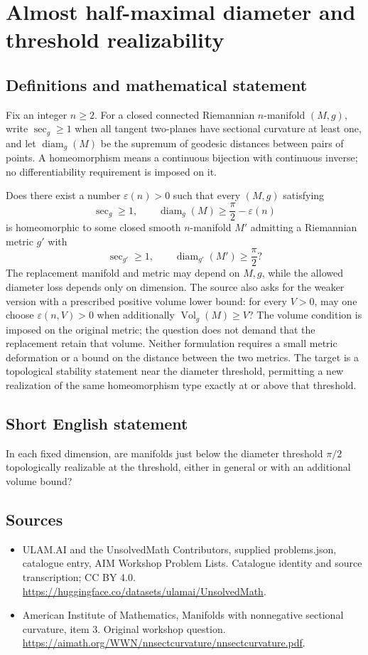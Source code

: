 \documentclass[11pt,a4paper]{article}
\begin{document}
\section*{Almost half-maximal diameter and threshold realizability}\label{statement}

\subsection{Definitions and mathematical statement}
Fix an integer $n\geq2$.
For a closed connected Riemannian $n$-manifold $(M,g)$, write $\sec_g\geq1$ when all tangent two-planes have sectional curvature at least one, and let $\operatorname{diam}_g(M)$ be the supremum of geodesic distances between pairs of points.
A homeomorphism means a continuous bijection with continuous inverse; no differentiability requirement is imposed on it.

Does there exist a number $\varepsilon(n)>0$ such that every $(M,g)$ satisfying
\[
 \sec_g\geq1,\qquad
 \operatorname{diam}_g(M)\geq\frac\pi2-\varepsilon(n)
\]
is homeomorphic to some closed smooth $n$-manifold $M'$ admitting a Riemannian metric $g'$ with
\[
 \sec_{g'}\geq1,\qquad
 \operatorname{diam}_{g'}(M')\geq\frac\pi2?
\]
The replacement manifold and metric may depend on $M,g$, while the allowed diameter loss depends only on dimension.
The source also asks for the weaker version with a prescribed positive volume lower bound: for every $V>0$, may one choose $\varepsilon(n,V)>0$ when additionally $\operatorname{Vol}_g(M)\geq V$?
The volume condition is imposed on the original metric; the question does not demand that the replacement retain that volume.
Neither formulation requires a small metric deformation or a bound on the distance between the two metrics.
The target is a topological stability statement near the diameter threshold, permitting a new realization of the same homeomorphism type exactly at or above that threshold.
\subsection{Short English statement}
In each fixed dimension, are manifolds just below the diameter threshold $\pi/2$ topologically realizable at the threshold, either in general or with an additional volume bound?
\subsection{Sources}
\begin{itemize}
\item[S1] ULAM.AI and the UnsolvedMath Contributors, supplied problems.json, catalogue entry, AIM Workshop Problem Lists. Catalogue identity and source transcription; CC BY 4.0.
\url{https://huggingface.co/datasets/ulamai/UnsolvedMath}.
\item[S2] American Institute of Mathematics, Manifolds with nonnegative sectional curvature, item 3. Original workshop question.
\url{https://aimath.org/WWN/nnsectcurvature/nnsectcurvature.pdf}.
\end{itemize}
\end{document}
